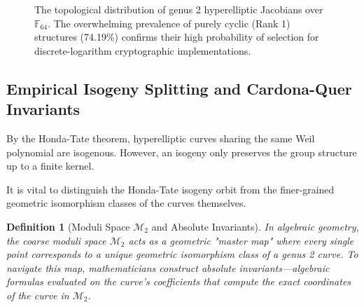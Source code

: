 \documentclass[letterpaper, 11pt]{article}
\newtheorem{definition}[theorem]{Definition}
\begin{document}
\begin{figure}[htpb]
    \centering
    \caption{The topological distribution of genus 2 hyperelliptic Jacobians over $\mathbb{F}_{64}$. The overwhelming prevalence of purely cyclic (Rank 1) structures (74.19\%) confirms their high probability of selection for discrete-logarithm cryptographic implementations.}
    \label{fig:rank_distribution}
\end{figure}

\subsection{Empirical Isogeny Splitting and Cardona-Quer Invariants}
By the Honda-Tate theorem, hyperelliptic curves sharing the same Weil polynomial are isogenous. However, an isogeny only preserves the group structure up to a finite kernel. 

It is vital to distinguish the Honda-Tate isogeny orbit from the finer-grained geometric isomorphism classes of the curves themselves. 

\begin{definition}[Moduli Space $\mathcal{M}_2$ and Absolute Invariants]
In algebraic geometry, the coarse moduli space $\mathcal{M}_2$ acts as a geometric "master map" where every single point corresponds to a unique geometric isomorphism class of a genus 2 curve. To navigate this map, mathematicians construct \textit{absolute invariants}—algebraic formulas evaluated on the curve's coefficients that compute the exact coordinates of the curve in $\mathcal{M}_2$.
\end{definition}
\end{document}
